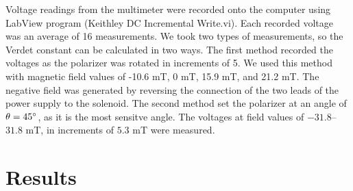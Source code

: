 \documentclass[prb,preprint]{revtex4-1}
\begin{document}
{Voltage readings from the multimeter were recorded onto the computer using LabView program (Keithley DC Incremental Write.vi). Each recorded voltage was an average of 16 measurements. We took two types of measurements, so the Verdet constant can be calculated in two ways.  The first method recorded the voltages as the polarizer was rotated in increments of 5\degree. We used this method with magnetic field values of -10.6 mT, 0 mT, 15.9 mT, and 21.2 mT. The negative field was generated by reversing the connection of the two leads of the power supply to the solenoid. The second method set the polarizer at an angle of $\theta = 45\degree$, as it is the most sensitve angle. The voltages at field values of $-31.8$--$31.8$ mT, in increments of $5.3$ mT were measured.
}


\section{Results}
\end{document}
